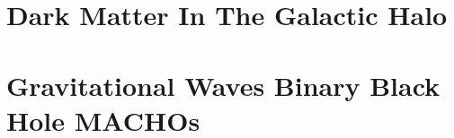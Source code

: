 \section{Dark Matter In The Galactic Halo}

\section{Gravitational Waves Binary Black Hole MACHOs}


